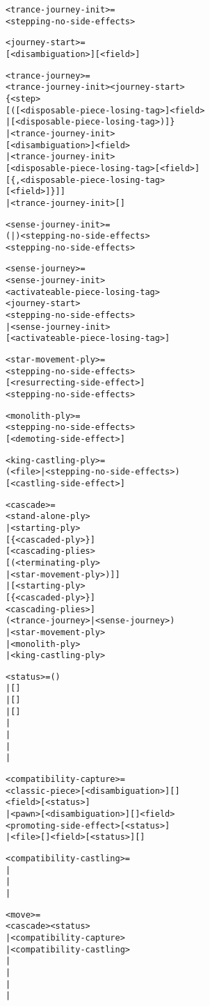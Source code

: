 \begin{alltt}
<trance-journey-init> =
  <stepping-no-side-effects>

<journey-start> =
  [<disambiguation>][\alg{,}<field>]

<trance-journey> =
  <trance-journey-init><journey-start>
  \{<step>
    [(\alg{<}[<disposable-piece-losing-tag>]<field>
      | \alg{*}[<disposable-piece-losing-tag>)]\}
| <trance-journey-init>
    [<disambiguation>]<field>
| <trance-journey-init>
  [<disposable-piece-losing-tag>[<field>]
    [\{,<disposable-piece-losing-tag>
      [<field>]\}]]
| <trance-journey-init>[]

<sense-journey-init> =
  (|)<stepping-no-side-effects>
  <stepping-no-side-effects>

<sense-journey> =
  <sense-journey-init>
  <activateable-piece-losing-tag>
  <journey-start>
  <stepping-no-side-effects>
| <sense-journey-init>
  [<activateable-piece-losing-tag>]
\end{alltt}

\clearpage %

\begin{alltt}
<star-movement-ply> =
  <stepping-no-side-effects>
    [<resurrecting-side-effect>]
    \alg{~}<stepping-no-side-effects>

<monolith-ply> =
  <stepping-no-side-effects>
  [<demoting-side-effect>]

<king-castling-ply> =
  (<file> | <stepping-no-side-effects>)
  [<castling-side-effect>]

<cascade> =
  <stand-alone-ply>
| <starting-ply>
  [\{<cascading-plies>\alg{~}<cascaded-ply>\}]
  [<cascading-plies>
    [\alg{~}(<terminating-ply>
      | <star-movement-ply>)]]
| [<starting-ply>
    [\{<cascading-plies>\alg{~}<cascaded-ply>\}]
    <cascading-plies>\alg{~}]
  (<trance-journey> | <sense-journey>)
| <star-movement-ply>
| <monolith-ply>
| <king-castling-ply>
\end{alltt}

\clearpage %

\begin{alltt}
<status> = ()
         | [\alg{+}]
         | [\alg{+}]\alg{(=)}
         | [\alg{+}]\alg{(-)}
         | \alg{#}
         | \algcty{++}
         | \alg{(=)}
         | \alg{(-)}

<compatibility-capture> =
  <classic-piece>[<disambiguation>][]
    <field>[<status>]
| <pawn>[<disambiguation>][]<field>
    <promoting-side-effect>[<status>]
| <file>[]<field>[<status>][]

<compatibility-castling> =
| 
| 
| 

<move> =
  <cascade><status>
| <compatibility-capture>
| <compatibility-castling>
| \alg{#}
| \alg{##}
| \alg{(==)}
| \alg{(===)}
\end{alltt}

